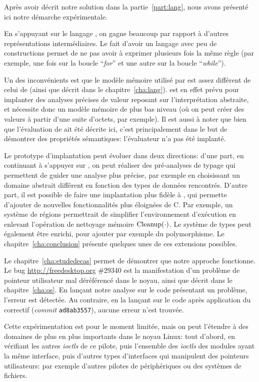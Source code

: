 Après avoir décrit notre solution dans la partie~\ref{part:lang}, nous avons
présenté ici notre démarche expérimentale.

En s'appuyant sur le langage \newspeak, on gagne beaucoup par rapport à d'autres
représentations intermédiaires. Le fait d'avoir un langage avec peu de
constructions permet de ne pas avoir à exprimer plusieurs fois la même règle
(par exemple, une fois sur la boucle ``\emph{for}'' et une autre sur la boucle
``\emph{while}'').

Un des inconvénients est que le modèle mémoire utilisé par \newspeak est assez
différent de celui de \langname (ainsi que décrit dans le
chapitre~\ref{cha:lang}). \newspeak est en effet prévu pour implanter des
analyses précises de valeur reposant sur l'interprétation abstraite, et
nécessite donc un modèle mémoire de plus bas niveau (où on peut créer des
valeurs à partir d'une suite d'octets, par exemple). Il est aussi à noter que
bien que l'évaluation de \langname ait été décrite ici, c'est principalement
dans le but de démontrer des propriétés sémantiques: l'évaluateur n'a pas été
implanté.

Le prototype d'implantation peut évoluer dans deux directions: d'une part, en
continuant à s'appuyer sur \newspeak, on peut réaliser des pré-analyses de
typage qui permettent de guider une analyse plus précise, par exemple en
choisissant un domaine abstrait différent en fonction des types de données
rencontrés. D'autre part, il est possible de faire une implantation plus fidèle
à \langname, qui permette d'ajouter de nouvelles fonctionnalités plus éloignées
de C. Par exemple, un système de régions permettrait de simplifier
l'environnement d'exécution en enlevant l'opération de nettoyage mémoire
$\mathrm{Cleanup}(\cdot)$. Le système de types peut également être enrichi, pour ajouter
par exemple du polymorphisme. Le chapitre~\ref{cha:conclusion} présente quelques
unes de ces extensions possibles.

Le chapitre~\ref{cha:etudedecas} permet de démontrer que notre approche
fonctionne. Le bug \url{http://freedesktop.org} \#29340 est la manifestation
d'un problème de pointeur utilisateur mal déréférencé dans le noyau, ainsi que
décrit dans le chapitre~\ref{cha:os}. En lançant notre analyse sur le code
présentant un problème, l'erreur est détectée. Au contraire, en la lançant sur
le code après application du correctif (\emph{commit} \texttt{ad8ab3557}),
aucune erreur n'est trouvée.

Cette expérimentation est pour le moment limitée, mais on peut l'étendre à des
domaines de plus en plus importants dans le noyau Linux: tout d'abord, en
vérifiant les autres \emph{ioctls} de ce pilote, puis l'ensemble des
\emph{ioctls} des modules ayant la même interface, puis d'autres types
d'interfaces qui manipulent des pointeurs utilisateurs: par exemple d'autres
pilotes de périphériques ou des systèmes de fichiers.

